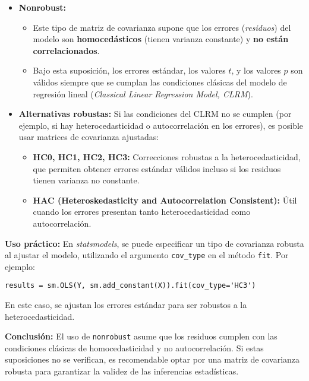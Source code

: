 \documentclass[a4paper,12pt]{article}
\begin{document}
\begin{itemize}
    \item \textbf{Nonrobust:} 
    \begin{itemize}
        \item Este tipo de matriz de covarianza supone que los errores (\textit{residuos}) del modelo son \textbf{homocedásticos} (tienen varianza constante) y \textbf{no están correlacionados}.
        \item Bajo esta suposición, los errores estándar, los valores $t$, y los valores $p$ son válidos siempre que se cumplan las condiciones clásicas del modelo de regresión lineal (\textit{Classical Linear Regression Model, CLRM}).
    \end{itemize}
    \item \textbf{Alternativas robustas:} Si las condiciones del CLRM no se cumplen (por ejemplo, si hay heterocedasticidad o autocorrelación en los errores), es posible usar matrices de covarianza ajustadas:
    \begin{itemize}
        \item \textbf{HC0, HC1, HC2, HC3:} Correcciones robustas a la heterocedasticidad, que permiten obtener errores estándar válidos incluso si los residuos tienen varianza no constante.
        \item \textbf{HAC (Heteroskedasticity and Autocorrelation Consistent):} Útil cuando los errores presentan tanto heterocedasticidad como autocorrelación.
    \end{itemize}
\end{itemize}

\textbf{Uso práctico:} En \textit{statsmodels}, se puede especificar un tipo de covarianza robusta al ajustar el modelo, utilizando el argumento \texttt{cov\_type} en el método \texttt{fit}. Por ejemplo:

\begin{lstlisting}[style=custompython, caption=Ajuste de un modelo OLS con covarianza robusta]
results = sm.OLS(Y, sm.add_constant(X)).fit(cov_type='HC3')
\end{lstlisting}

En este caso, se ajustan los errores estándar para ser robustos a la heterocedasticidad.

\textbf{Conclusión:} El uso de \texttt{nonrobust} asume que los residuos cumplen con las condiciones clásicas de homocedasticidad y no autocorrelación. Si estas suposiciones no se verifican, es recomendable optar por una matriz de covarianza robusta para garantizar la validez de las inferencias estadísticas.
\end{document}
